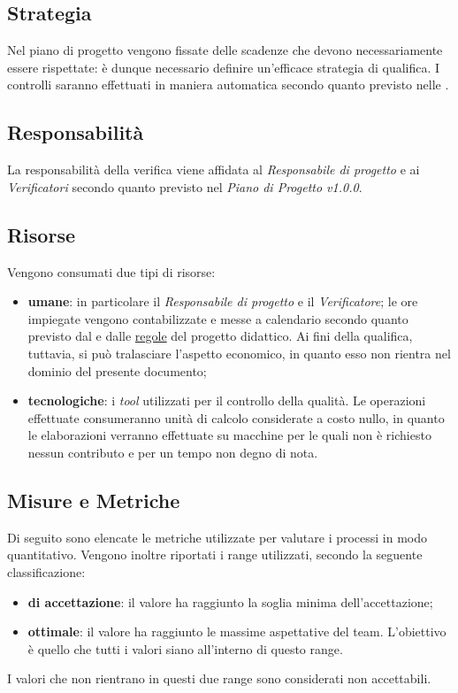 \subsection{Strategia}
Nel piano di progetto vengono fissate delle scadenze che devono necessariamente essere rispettate: è dunque necessario definire un'efficace strategia di qualifica. I controlli saranno effettuati in maniera automatica secondo quanto previsto nelle \NormeDiProgetto. 

\subsection{Responsabilità}
La responsabilità della verifica viene affidata al \textit{Responsabile di progetto} e ai \textit{Verificatori} secondo quanto previsto nel \textit{Piano di Progetto v1.0.0}.

\subsection{Risorse}
Vengono consumati due tipi di risorse:
\begin{itemize}
	\item \textbf{umane}: in particolare il \textit{Responsabile di progetto} e il \textit{Verificatore}; le ore impiegate vengono contabilizzate e messe a calendario secondo quanto previsto dal \PianoDiProgetto e dalle \href{http://www.math.unipd.it/~tullio/IS-1/2015/Dispense/PD01.pdf}{regole} del progetto didattico. Ai fini della qualifica, tuttavia, si può tralasciare l'aspetto economico, in quanto esso non rientra nel dominio del presente documento;
		\item \textbf{tecnologiche}: i \textit{tool} utilizzati per il controllo della qualità. Le operazioni effettuate  consumeranno unità di calcolo considerate a costo nullo, in quanto le elaborazioni verranno effettuate su macchine per le quali non è richiesto nessun contributo e per un tempo non degno di nota.
\end{itemize}

\subsection{Misure e Metriche}\label{MisureMetriche}
Di seguito sono elencate le metriche utilizzate per valutare i processi in modo quantitativo. Vengono inoltre riportati i range utilizzati, secondo la seguente classificazione:
\begin{itemize}
	\item \textbf{di accettazione}: il valore ha raggiunto la soglia minima dell'accettazione;
	\item \textbf{ottimale}: il valore ha raggiunto le massime aspettative del team. L'obiettivo è quello che tutti i valori siano all'interno di questo range.
\end{itemize}
I valori che non rientrano in questi due range sono considerati non accettabili.

